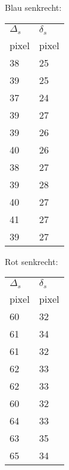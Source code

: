 Blau senkrecht:
\begin{tabular}[h]{l|l}
    $\Delta_s$ & $\delta_s$ \\
    pixel & pixel \\
    \hline
    38 & 25 \\
    39 & 25 \\
    37 & 24 \\
    39 & 27 \\
    39 & 26 \\
    40 & 26 \\
    38 & 27 \\
    39 & 28 \\
    40 & 27 \\
    41 & 27 \\
    39 & 27 \\
\end{tabular}

Rot senkrecht:
\begin{tabular}[h]{l|l}
    $\Delta_s$ & $\delta_s$ \\
    pixel & pixel \\
    \hline
    60 & 32 \\
    61 & 34 \\
    61 & 32 \\
    62 & 33 \\
    62 & 33 \\
    60 & 32 \\
    64 & 33 \\
    63 & 35 \\
    65 & 34 \\
\end{tabular}